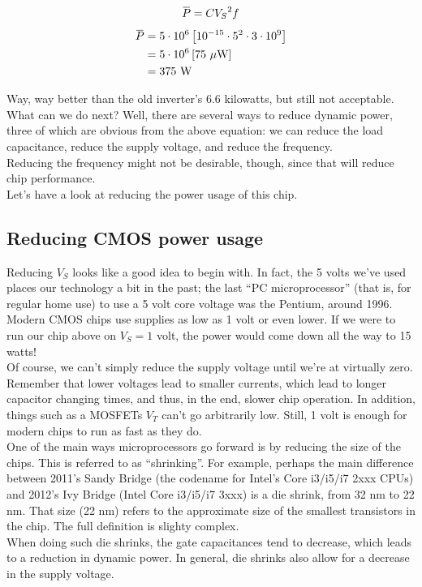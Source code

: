 \documentclass[12pt,a4paper]{report}
\newcommand{\overbar}[1]{\mkern 1.5mu\overline{\mkern-1.5mu#1\mkern-1.5mu}\mkern 1.5mu}
\begin{document}
\[ \overbar{P} = C {V_S}^2 f \]
\begin{align*}
  \overbar{P} &= 5\cdot 10^6 \left[ 10^{-15} \cdot {5}^2 \cdot 3 \cdot 10^9 \right] \\
    &= 5\cdot 10^6 \left[ 75 \text { } \mu \text{W} \right] \\
    &= 375 \text { W}
\end{align*}

Way, way better than the old inverter's 6.6 kilowatts, but still not acceptable. What can we do next? Well, there are several ways to reduce dynamic power, three of which are obvious from the above equation: we can reduce the load capacitance, reduce the supply voltage, and reduce the frequency.\\
Reducing the frequency might not be desirable, though, since that will reduce chip performance.\\

Let's have a look at reducing the power usage of this chip.

\subsection{Reducing CMOS power usage}

Reducing $V_S$ looks like a good idea to begin with. In fact, the 5 volts we've used places our technology a bit in the past; the last ``PC microprocessor'' (that is, for regular home use) to use a 5 volt core voltage was the Pentium, around 1996. Modern CMOS chips use supplies as low as 1 volt or even lower. If we were to run our chip above on $V_S = 1$ volt, the power would come down all the way to 15 watts!\\
Of course, we can't simply reduce the supply voltage until we're at virtually zero. Remember that lower voltages lead to smaller currents, which lead to longer capacitor changing times, and thus, in the end, slower chip operation. In addition, things such as a MOSFETs $V_T$ can't go arbitrarily low. Still, 1 volt is enough for modern chips to run as fast as they do.\\

One of the main ways microprocessors go forward is by reducing the size of the chips. This is referred to as ``shrinking''. For example, perhaps the main difference between 2011's Sandy Bridge (the codename for Intel's Core i3/i5/i7 2xxx CPUs) and 2012's Ivy Bridge (Intel Core i3/i5/i7 3xxx) is a die shrink, from 32 nm to 22 nm. That size (22 nm) refers to the approximate size of the smallest transistors in the chip. The full definition is slighty complex.\\
When doing such die shrinks, the gate capacitances tend to decrease, which leads to a reduction in dynamic power. In general, die shrinks also allow for a decrease in the supply voltage.\\
\end{document}
